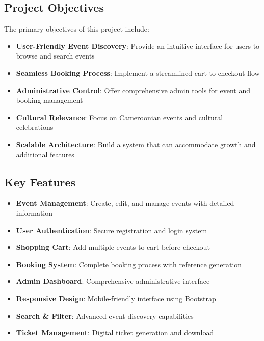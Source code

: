 \documentclass[12pt,a4paper]{article}
\begin{document}
\subsection{Project Objectives}
The primary objectives of this project include:

\begin{itemize}
    \item \textbf{User-Friendly Event Discovery}: Provide an intuitive interface for users to browse and search events
    \item \textbf{Seamless Booking Process}: Implement a streamlined cart-to-checkout flow
    \item \textbf{Administrative Control}: Offer comprehensive admin tools for event and booking management
    \item \textbf{Cultural Relevance}: Focus on Cameroonian events and cultural celebrations
    \item \textbf{Scalable Architecture}: Build a system that can accommodate growth and additional features
\end{itemize}

\subsection{Key Features}

\begin{tcolorbox}[colback=blue!5!white,colframe=blue!75!black,title=Core Features]
\begin{itemize}
    \item \textbf{Event Management}: Create, edit, and manage events with detailed information
    \item \textbf{User Authentication}: Secure registration and login system
    \item \textbf{Shopping Cart}: Add multiple events to cart before checkout
    \item \textbf{Booking System}: Complete booking process with reference generation
    \item \textbf{Admin Dashboard}: Comprehensive administrative interface
    \item \textbf{Responsive Design}: Mobile-friendly interface using Bootstrap
    \item \textbf{Search \& Filter}: Advanced event discovery capabilities
    \item \textbf{Ticket Management}: Digital ticket generation and download
\end{itemize}
\end{tcolorbox}
\end{document}
